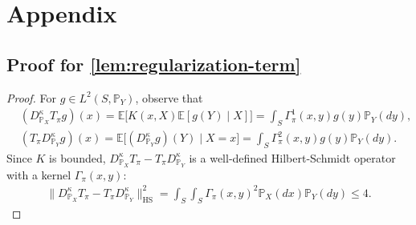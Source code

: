 \documentclass{article}
\begin{document}

\appendix
\section{Appendix}
\subsection{Proof for \cref{lem:regularization-term}}\label{pf:lem:regularization-term}
\begin{proof}
	For $g \in L^2(S,\mathbb{P}_Y)$, observe that
	\begin{align*}
		&(D_{\mathbb{P}_X}^{\kappa}T_{\pi}g)(x) = \mathbb{E}\Big[K(x,X)\mathbb{E}\left[g(Y) \mid X\right]\Big] = \int_S \Gamma_\pi^1(x,y)g(y)\mathbb{P}_Y(dy) , \\
		&(T_{\pi}D_{\mathbb{P}_Y}^{\kappa}g)(x) = \mathbb{E}\Big[(D_{\mathbb{P}_Y}^{\kappa}g)(Y) \mid X = x\Big] = \int_S \Gamma_\pi^2(x,y)g(y) \mathbb{P}_Y(dy) .
	\end{align*}
	Since $K$ is bounded, $D_{\mathbb{P}_X}^{\kappa}T_{\pi} - T_{\pi}D_{\mathbb{P}_Y}^{\kappa}$ is a well-defined Hilbert-Schmidt operator with a kernel $\Gamma_\pi(x,y)$:
	\begin{align*}
		\| D_{\mathbb{P}_X}^{\kappa}T_{\pi} - T_{\pi}D_{\mathbb{P}_Y}^{\kappa} \|_{\mathrm{HS}}^2 = \int_S\int_S \Gamma_\pi(x,y)^2\mathbb{P}_X(dx)\mathbb{P}_Y(dy) \leq 4 .
	\end{align*}
\end{proof}
\end{document}
